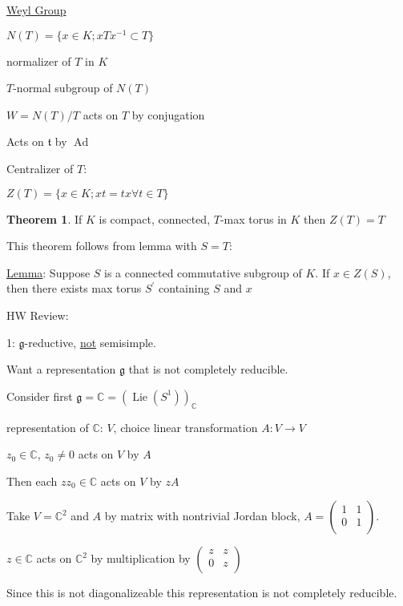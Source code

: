 \documentclass{article}
\theoremstyle{definition}
\newtheorem{theorem}{Theorem}
\newcommand{\Ad}{\operatorname{Ad}}
\begin{document}
\underline{Weyl Group} 

\(N(T)=\{ x\in K ; x T x ^{-1} \subset T \} \)

normalizer of \(T\) in \(K\) 

\(T\)-normal subgroup of \(N(T)\) 

\(W = N(T) / T\) acts on \(T\) by conjugation

Acts on \(\mathfrak{t}\) by \(\Ad\)

Centralizer of \(T\):

\(Z(T) = \{ x\in K ; xt = tx \forall t \in T \}\) 

\begin{theorem}
    If \(K\) is compact, connected, \(T\)-max torus in \(K\) then \(Z(T)=T\) 
\end{theorem}

This theorem follows from lemma with \(S = T\):

\underline{Lemma}: Suppose \(S\) is a connected commutative subgroup of \(K\). If \(x\in Z(S)\), then there exists max torus \(S^{\prime}\) containing \(S\) and \(x\) 

HW Review:

1: \(\mathfrak{g}\)-reductive, \underline{not} semisimple.

Want a representation \(\mathfrak{g}\) that is not completely reducible.

Consider first \(\mathfrak{g} = \mathbb{C} = (\operatorname{Lie}(S^1))_\mathbb{C}\) 

representation of \(\mathbb{C}\): \(V\), choice linear transformation \(A: V \to V\)

\(z_0\in\mathbb{C}\), \(z_0\neq 0\)  acts on \(V\) by \(A\)  

Then each \(z z_0\in\mathbb{C}\) acts on \(V\) by \(z A\) 

Take \(V = \mathbb{C}^2\) and \(A\) by matrix with nontrivial Jordan block, \(A = \begin{pmatrix}
    1 &  1 \\
    0 &  1 \\
\end{pmatrix}\).

\(z\in\mathbb{C}\) acts on \(\mathbb{C}^2\) by multiplication by \(\begin{pmatrix}
    z &  z \\
    0 &  z \\
\end{pmatrix}\)   

Since this is not diagonalizeable this representation is not completely reducible.
\end{document}
